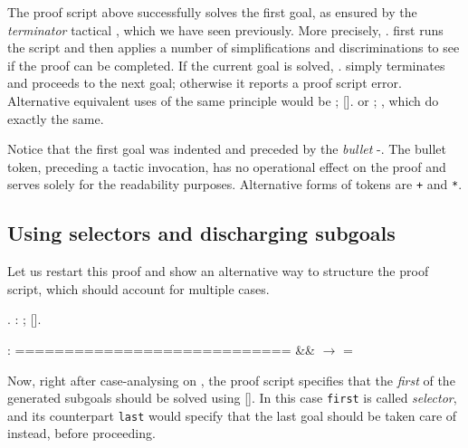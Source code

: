 The proof script above successfully solves the first goal, as ensured
by the \textit{terminator} tactical  ,
which we have seen previously. More precisely,  . first runs
the script  and then applies a number of simplifications and
discriminations to see if the proof can be completed. If the current
goal is solved,  . simply terminates and proceeds to the next
goal; otherwise it reports a proof script error. Alternative
equivalent uses of the same principle would be ;  []. or ;
, which do exactly the same.


Notice that the first goal was indented and preceded by the \textit{bullet}
-.  The bullet token, preceding a tactic
invocation, has no operational effect on the proof and serves solely
for the readability purposes. Alternative forms of tokens are
\texttt{+} and \texttt{*}.


\subsection{Using selectors and discharging subgoals}




Let us restart this proof and show an alternative way to structure the
proof script, which should account for multiple cases.


\begin{coqdoccode}
\coqdocemptyline
\coqdocnoindent
{}.\coqdoceol
\coqdocnoindent
{}: ;   [].\coqdoceol
\coqdocemptyline
\end{coqdoccode}


\coqdoceol
\coqdocemptyline
\coqdocindent{1.00em}
 : \coqdoceol
\coqdocindent{1.00em}
============================\coqdoceol
\coqdocindent{1.50em}
 \&\&  \ensuremath{\rightarrow}  = 

\coqdocemptyline




Now, right after case-analysing on , the proof script specifies
that the \textit{first} of the generated subgoals should be solved using 
[]. In this case \texttt{first} is called \textit{selector}, and its
counterpart \texttt{last} would specify that the last goal should be
taken care of instead, before proceeding.


